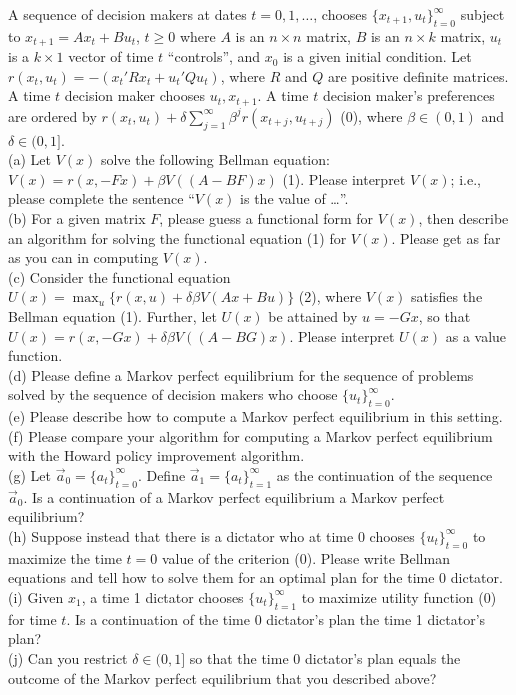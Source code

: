 \documentclass[12pt, letterpaper]{article}
\begin{document}
\begin{tcolorbox}[evenbox,title={Exercise 2.30 \quad Phelps and Pollak (1968) Meet Howard}]
\begin{tcolorbox}[questionbox]
A sequence of decision makers at dates $t=0,1,\dots$, chooses $\{x_{t+1},u_t\}_{t=0}^\infty$ subject to
$x_{t+1}=Ax_t+Bu_t$, $t\ge0$ where $A$ is an $n\times n$ matrix, $B$ is an $n\times k$ matrix, $u_t$
is a $k\times1$ vector of time $t$ ``controls'', and $x_0$ is a given initial condition. Let
$r(x_t,u_t)=-(x_t'Rx_t+u_t'Qu_t)$, where $R$ and $Q$ are positive definite matrices. A time $t$
decision maker chooses $u_t,x_{t+1}$. A time $t$ decision maker's preferences are ordered by
$r(x_t,u_t)+\delta\sum_{j=1}^\infty\beta^jr(x_{t+j},u_{t+j})$ (0), where $\beta\in(0,1)$ and
$\delta\in(0,1]$.\\[3pt]
(a) Let $V(x)$ solve the following Bellman equation: $V(x)=r(x,-Fx)+\beta V((A-BF)x)$ (1). Please
interpret $V(x)$; i.e., please complete the sentence ``$V(x)$ is the value of \dots''.\\
(b) For a given matrix $F$, please guess a functional form for $V(x)$, then describe an algorithm for
solving the functional equation (1) for $V(x)$. Please get as far as you can in computing $V(x)$.\\
(c) Consider the functional equation $U(x)=\max_u\{r(x,u)+\delta\beta V(Ax+Bu)\}$ (2), where $V(x)$
satisfies the Bellman equation (1). Further, let $U(x)$ be attained by $u=-Gx$, so that
$U(x)=r(x,-Gx)+\delta\beta V((A-BG)x)$. Please interpret $U(x)$ as a value function.\\
(d) Please define a Markov perfect equilibrium for the sequence of problems solved by the sequence of
decision makers who choose $\{u_t\}_{t=0}^\infty$.\\
(e) Please describe how to compute a Markov perfect equilibrium in this setting.\\
(f) Please compare your algorithm for computing a Markov perfect equilibrium with the Howard policy
improvement algorithm.\\
(g) Let $\vec a_0=\{a_t\}_{t=0}^\infty$. Define $\vec a_1=\{a_t\}_{t=1}^\infty$ as the continuation of the
sequence $\vec a_0$. Is a continuation of a Markov perfect equilibrium a Markov perfect equilibrium?\\
(h) Suppose instead that there is a dictator who at time 0 chooses $\{u_t\}_{t=0}^\infty$ to maximize the
time $t=0$ value of the criterion (0). Please write Bellman equations and tell how to solve them for
an optimal plan for the time 0 dictator.\\
(i) Given $x_1$, a time 1 dictator chooses $\{u_t\}_{t=1}^\infty$ to maximize utility function (0) for
time $t$. Is a continuation of the time 0 dictator's plan the time 1 dictator's plan?\\
(j) Can you restrict $\delta\in(0,1]$ so that the time 0 dictator's plan equals the outcome of the
Markov perfect equilibrium that you described above?
\end{tcolorbox}


\end{tcolorbox}
\end{document}
